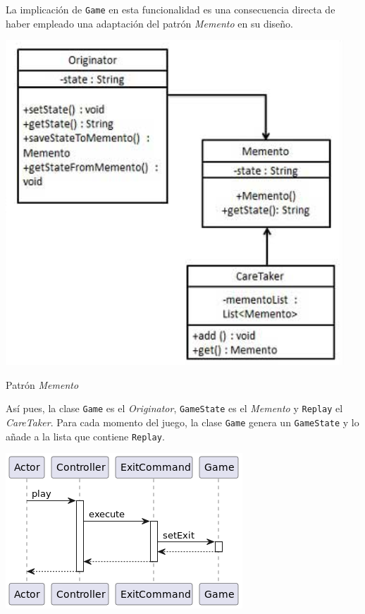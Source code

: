 \documentclass[../DocumentoOficial.tex]{subfiles}
\begin{document}
La implicación de \texttt{Game} en esta funcionalidad es una consecuencia directa de haber empleado una adaptación del patrón \textit{Memento} en su diseño.

\begin{center}
\includegraphics[scale=0.8]{patronmemento.png}

Patrón \textit{Memento}
\end{center}

Así pues, la clase \texttt{Game} es el \textit{Originator}, \texttt{GameState} es el \textit{Memento} y \texttt{Replay} el \textit{CareTaker}. Para cada momento del juego, la clase \texttt{Game} genera un \texttt{GameState} y lo añade a la lista que contiene \texttt{Replay}.

\begin{center}
\includegraphics[scale=0.7]{addState-replay-sprint-6.png}
\end{center}
\end{document}
